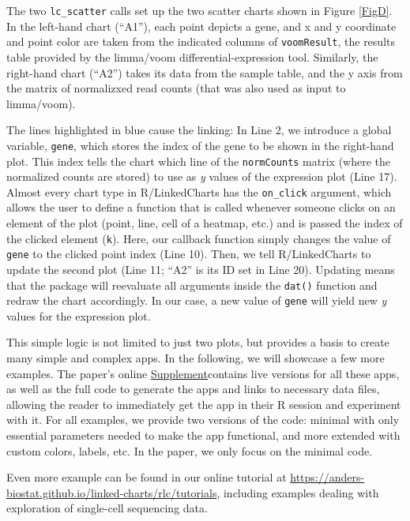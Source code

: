\documentclass[twocolumn,10pt]{article}
\newcommand{\Supplement}{\href{https://anders-biostat.github.io/lc-paper/}{Supplement}}
\begin{document}
The two \texttt{lc_scatter} calls set up the two scatter charts shown in Figure \ref{FigD}. In the left-hand chart (``A1''), each point depicts a gene, and x and y coordinate and point color are taken from the indicated columns of \texttt{voomResult}, the results table provided by the limma/voom differential-expression tool. Similarly, the right-hand chart (``A2'') takes its data from the sample table, and the y axis from the matrix of normalizxed read counts (that was also used as input to limma/voom).

The lines highlighted in blue cause the linking: In Line 2, we introduce a global variable, \texttt{gene}, which stores the index of the gene to be shown in the right-hand plot. This index tells the chart which line of the \texttt{normCounts} matrix (where the normalized counts are stored) to use as \emph{y} values of the expression plot (Line 17). Almost every chart type in R/LinkedCharts has the \texttt{on_click} argument, which allows the user to define a function that is called whenever someone clicks on an element of the plot (point, line, cell of a heatmap, etc.) and is passed the index of the clicked element (\texttt{k}).  Here, our callback function simply changes the value of \texttt{gene} to the clicked point index (Line 10). Then, we tell R/LinkedCharts to update the second plot (Line 11; ``A2'' is its ID set in Line 20). Updating means that the package will reevaluate all arguments inside the \texttt{dat()} function and redraw the chart accordingly. In our case, a new value of \texttt{gene} will yield new \emph{y} values for the expression plot.

This simple logic is not limited to just two plots, but provides a basis to create many simple and complex apps. In the following, we will showcase a few more examples. The paper's online \Supplement contains live versions for all these apps, as well as the full code to generate the apps and links to necessary data files, allowing the reader to immediately get the app in their R session and experiment with it. For all examples, we provide two versions of the code: minimal with only essential parameters needed to make the app functional, and more extended with custom colors, labels, etc. In the paper, we only focus on the minimal code.

Even more example can be found in our online tutorial at \url{https://anders-biostat.github.io/linked-charts/rlc/tutorials}, including examples dealing with exploration of single-cell sequencing data.
\end{document}
